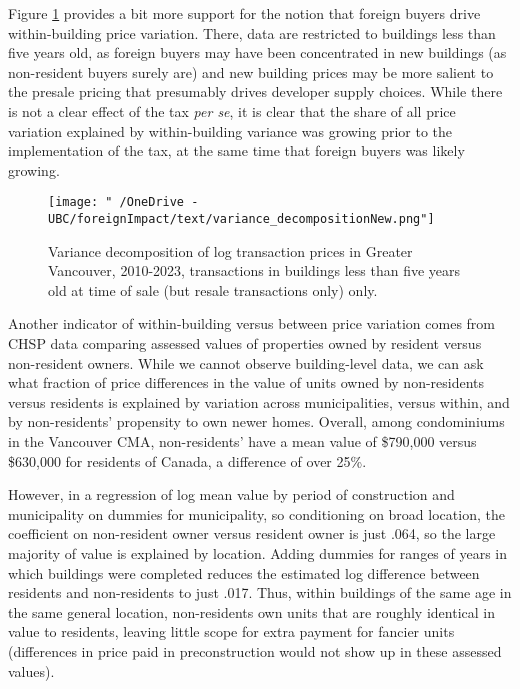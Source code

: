 \documentclass[12pt]{article}
\begin{document}
Figure \ref{fig:varianceDecompositionNew} provides a bit more support for the
notion that foreign buyers drive within-building price variation. There, data
are restricted to buildings less than five years old, as foreign buyers may
have been concentrated in new buildings (as non-resident buyers surely are) and
new building prices may be more salient to the presale pricing that presumably
drives developer supply choices.  While there is not a clear effect of the tax
\emph{per se}, it is clear that the share of all price variation explained by
within-building variance was growing prior to the implementation of the tax, at
the same time that foreign buyers was likely growing.

\begin{figure}
\caption{\label{fig:varianceDecompositionNew} Variance decomposition of log transaction prices in Greater Vancouver, 2010-2023, transactions in buildings less than five years old at time of sale (but resale transactions only) only.}
\texttt{[image: "~/OneDrive - UBC/foreignImpact/text/variance\_decompositionNew.png"]}
\end{figure}

Another indicator of within-building versus between price variation comes from
CHSP data comparing assessed values of properties owned by resident versus
non-resident owners. While we cannot observe building-level data, we can ask
what fraction of price differences in the value of units owned by non-residents
versus residents is explained by variation across municipalities, versus
within, and by non-residents' propensity to own newer homes. Overall, among condominiums in the Vancouver CMA, non-residents' have a mean value of \$790,000 versus \$630,000 for residents of Canada, a difference of over 25\%.

However, in a regression of log mean value by period of construction and municipality on dummies for municipality, so conditioning on broad location, the coefficient on non-resident owner versus resident owner is just .064, so the large majority of value is explained by location. Adding dummies for ranges of years in which buildings were completed reduces the estimated log difference between residents and non-residents to just .017. Thus, within buildings of the same age in the same general location, non-residents own units that are roughly identical in value to residents, leaving little scope for extra payment for fancier units (differences in price paid in preconstruction would not show up in these assessed values).
\end{document}
